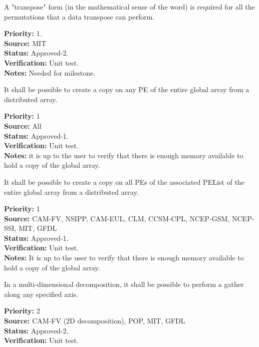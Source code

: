 A "transpose" form (in the mathematical sense of the word) is required
for all the permutations that a data transpose can perform.
\begin{reqlist}
{\bf Priority:} 1. \\ 
{\bf Source:}  MIT \\
{\bf Status:} Approved-2. \\
{\bf Verification:} Unit test. \\
{\bf Notes:} Needed for milestone.
\end{reqlist}


It shall be possible to create a copy on any PE of the entire global
array from a distributed array.

\begin{reqlist}
{\bf Priority:} 1 \\  
{\bf Source:} All \\
{\bf Status:} Approved-1. \\
{\bf Verification:} Unit test. \\
{\bf Notes:} it is up to the user to verify that there is enough
memory available to hold a copy of the global array.
\end{reqlist}


It shall be possible to create a copy on all PEs of the associated
PEList of the entire global array from a distributed array.

\begin{reqlist}
{\bf Priority:} 1 \\ 
{\bf Source:} CAM-FV, NSIPP, CAM-EUL, CLM, CCSM-CPL, NCEP-GSM, NCEP-SSI, MIT, GFDL \\
{\bf Status:} Approved-1. \\
{\bf Verification:} Unit test. \\
{\bf Notes:} It is up to the user to verify that there is enough
memory available to hold a copy of the global array.
\end{reqlist}

 \label{DG:PartGather}

In a multi-dimensional decomposition, it shall be possible to perform
a gather along any specified axis.

\begin{reqlist}
{\bf Priority:} 2 \\ 
{\bf Source:} CAM-FV (2D decomposition), POP, MIT, GFDL \\
{\bf Status:} Approved-2. \\
{\bf Verification:} Unit test. 
\end{reqlist}

